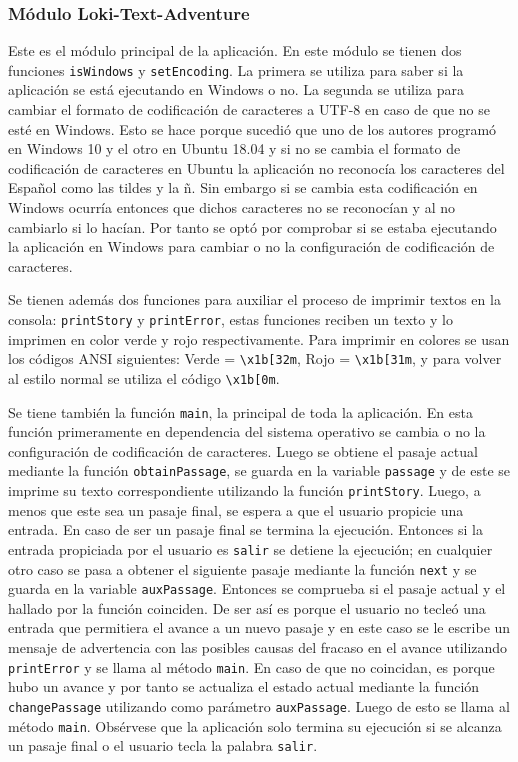 \documentclass[12pt]{article}
\begin{document}
\subsubsection{Módulo Loki-Text-Adventure}

Este es el m\'odulo principal de la aplicaci\'on. En este m\'odulo se tienen dos funciones \verb|isWindows| y \verb|setEncoding|. La primera se utiliza para saber si la aplicaci\'on se est\'a ejecutando en Windows o no. La segunda se utiliza para cambiar el formato de codificaci\'on de caracteres a UTF-8 en caso de que no se esté en Windows. Esto se hace porque sucedió que uno de los autores program\'o en Windows 10 y el otro en Ubuntu 18.04 y si no se cambia el formato de codificaci\'on de caracteres en Ubuntu la aplicaci\'on no reconoc\'ia los caracteres del Español como las tildes y la ñ. Sin embargo si se cambia esta codificaci\'on en Windows ocurr\'ia entonces que dichos caracteres no se reconoc\'ian y al no cambiarlo si lo hac\'ian. Por tanto se opt\'o por comprobar si se estaba ejecutando la aplicaci\'on en Windows para cambiar o no la configuraci\'on de codificaci\'on de caracteres.

Se tienen adem\'as dos funciones para auxiliar el proceso de imprimir textos en la consola: \verb|printStory| y \verb|printError|, estas funciones reciben un texto y lo imprimen en color verde y rojo respectivamente. Para imprimir en colores se usan los códigos ANSI siguientes: Verde = \verb|\x1b[32m|, Rojo = \verb|\x1b[31m|, y para volver al estilo normal se utiliza el código \verb|\x1b[0m|.

Se tiene tambi\'en la funci\'on \verb|main|, la principal de toda la aplicaci\'on. En esta funci\'on primeramente en dependencia del sistema operativo se cambia o no la configuraci\'on de codificaci\'on de caracteres. Luego se obtiene el pasaje actual mediante la funci\'on \verb|obtainPassage|, se guarda en la variable \verb|passage| y de este se imprime su texto correspondiente utilizando la función \verb|printStory|. Luego, a menos que este sea un pasaje final, se espera a que el usuario propicie una entrada. En caso de ser un pasaje final se termina la ejecuci\'on. Entonces si la entrada propiciada por el usuario es \verb|salir| se detiene la ejecuci\'on; en cualquier otro caso se pasa a obtener el siguiente pasaje mediante la funci\'on \verb|next| y se guarda en la variable \verb|auxPassage|. Entonces se comprueba si el pasaje actual y el hallado por la funci\'on coinciden. De ser as\'i es porque el usuario no tecleó una entrada que permitiera el avance a un nuevo pasaje y en este caso se le escribe un mensaje de advertencia con las posibles causas del fracaso en el avance utilizando \verb|printError| y se llama al m\'etodo \verb|main|. En caso de que no coincidan, es porque hubo un avance y por tanto se actualiza el estado actual mediante la funci\'on \verb|changePassage| utilizando como par\'ametro \verb|auxPassage|. Luego de esto se llama al m\'etodo \verb|main|. Obs\'ervese que la aplicaci\'on solo termina su ejecuci\'on si se alcanza un pasaje final o el usuario tecla la palabra \verb|salir|.   
\end{document}
